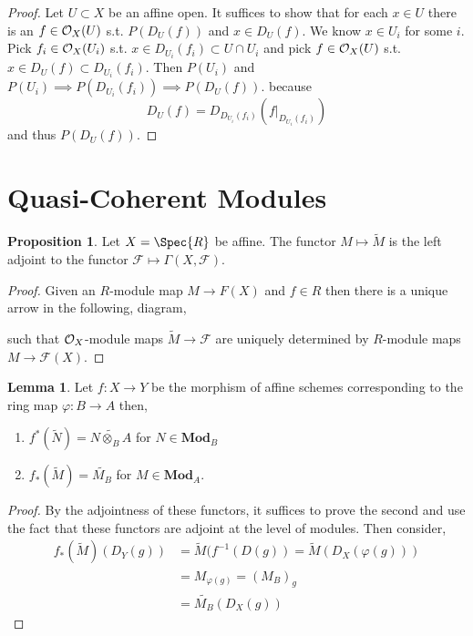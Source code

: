\documentclass[12pt]{extarticle}
\theoremstyle{definition}
\newtheorem{lemma}[theorem]{Lemma}
\newtheorem{proposition}[theorem]{Proposition}
\newcommand{\F}{\mathcal{F}}
\begin{document}
\begin{proof}
Let $U \subset X$ be an affine open. It suffices to show that for each $x \in U$ there is an $f \in \mathcal{O}_{X}(U)$ s.t. $P(D_U(f))$ and $x \in D_U(f)$. We know $x \in U_i$ for some $i$. Pick $f_i \in \mathcal{O}_{X}(U_i)$ s.t. $x \in D_{U_i}(f_i) \subset U \cap U_i$ and pick $f \in \mathcal{O}_{X}(U)$ s.t. $x \in D_U(f) \subset D_{U_i}(f_i)$. Then $P(U_i)$ and $P(U_i) \implies P(D_{U_i}(f_i)) \implies P(D_U(f))$. because
\[ D_U(f) = D_{D_{U_i}(f_i)}(f|_{D_{U_i}(f_i)}) \]
and thus $P(D_U(f))$. 
\end{proof}

\section{Quasi-Coherent Modules}

\renewcommand{\Mod}[1]{\mathbf{Mod}_{#1}}

\begin{proposition}
Let $X = \Spec{R}$ be affine. The functor $M \mapsto \widetilde{M}$ is the left adjoint to the functor $\F \mapsto \Gamma(X, \F)$.  
\end{proposition}

\begin{proof}
Given an $R$-module map $M \to F(X)$ and $f \in R$ then there is a unique arrow in the following, diagram,
\begin{center}
\end{center}
such that $\mathcal{O}_{X}$-module maps $\widetilde{M} \to \F$ are uniquely determined by $R$-module maps $M \to \F(X)$.
\end{proof}

\begin{lemma}
Let $f : X \to Y$ be the morphism of affine schemes corresponding to the ring map $\varphi : B \to A$ then,
\begin{enumerate}
\item $f^*(\widetilde{N}) = \widetilde{N \otimes_B A}$ for $N \in \Mod{B}$
\item $f_*(\widetilde{M}) = \widetilde{M_B}$ for $M \in \Mod{A}$. 
\end{enumerate}
\end{lemma}

\begin{proof}
By the adjointness of these functors, it suffices to prove the second and use the fact that these functors are adjoint at the level of modules. Then consider,
\begin{align*}
f_*(\widetilde{M})(D_Y(g)) & = \widetilde{M}(f^{-1}(D(g)) = \widetilde{M}(D_X(\varphi(g))) 
\\
& = M_{\varphi(g)} = (M_B)_g 
\\
& = \widetilde{M_B}(D_X(g))
\end{align*}
\end{proof}
\end{document}
